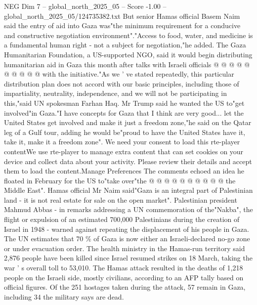 \begin{textsample}{NEG Dim 7 – global\_north\_2025\_05 – Score -1.00 – global\_north\_2025\_05/124735382.txt}
But senior Hamas official Basem Naim said the entry of aid into Gaza was"the minimum requirement for a conducive and constructive negotiation environment"."Access to food, water, and medicine is a fundamental human right - not a subject for negotiation,"he added.
The Gaza Humanitarian Foundation, a US-supported NGO, said it would begin distributing humanitarian aid in Gaza this month after talks with Israeli officials @ @ @ @ @ @ @ @ @ @ with the initiative."As we ' ve stated repeatedly, this particular distribution plan does not accord with our basic principles, including those of impartiality, neutrality, independence, and we will not be participating in this,"said UN spokesman Farhan Haq.
Mr Trump said he wanted the US to"get involved"in Gaza."I have concepts for Gaza that I think are very good... let the United States get involved and make it just a freedom zone,"he said on the Qatar leg of a Gulf tour, adding he would be"proud to have the United States have it, take it, make it a freedom zone".
We need your consent to load this rte-player contentWe use rte-player to manage extra content that can set cookies on your device and collect data about your activity.
Please review their details and accept them to load the content.Manage Preferences The comments echoed an idea he floated in February for the US to"take over"the @ @ @ @ @ @ @ @ @ @ the Middle East".
Hamas official Mr Naim said"Gaza is an integral part of Palestinian land - it is not real estate for sale on the open market".
Palestinian president Mahmud Abbas - in remarks addressing a UN commemoration of the"Nakba", the flight or expulsion of an estimated 700,000 Palestinians during the creation of Israel in 1948 - warned against repeating the displacement of his people in Gaza.
The UN estimates that 70 \% of Gaza is now either an Israeli-declared no-go zone or under evacuation order.
The health ministry in the Hamas-run territory said 2,876 people have been killed since Israel resumed strikes on 18 March, taking the war ' s overall toll to 53,010.
The Hamas attack resulted in the deaths of 1,218 people on the Israeli side, mostly civilians, according to an AFP tally based on official figures.
Of the 251 hostages taken during the attack, 57 remain in Gaza, including 34 the military says are dead.

\end{textsample}
